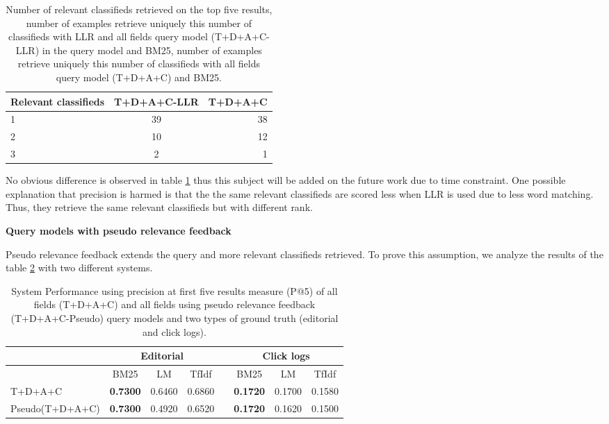 \begin{table}[H]
\begin{center}
\caption{Number of relevant classifieds retrieved on the top five results, number of examples retrieve uniquely this number of classifieds with LLR and all fields query model (T+D+A+C-LLR) in the query model and BM25, number of examples retrieve uniquely this number of classifieds with all fields query model (T+D+A+C) and BM25.}
\label{table:LLRP5}

\begin{tabular}{lcr}
\midrule
Relevant classifieds &  T+D+A+C-LLR & T+D+A+C \\
\midrule
	1 & 39 & 38 \\
	2 & 10 & 12  \\
	3 & 2 & 1 \\
\bottomrule
\end{tabular}
\end{center}
\end{table}



No obvious difference is observed in table \ref{table:LLRP5} thus this subject will be added on the future work due to time constraint. One possible explanation that precision is harmed is that the the same relevant classifieds are scored less when LLR is used due to less word matching. Thus, they retrieve the same relevant classifieds but with different rank.


 \textbf{Query models with pseudo relevance feedback}

 Pseudo relevance feedback extends the query and more relevant classifieds retrieved. To prove this assumption, we analyze the results of the table \ref{table:PseudoP5} with two different systems.

\begin{table}[H]
\begin{center}
\caption{System Performance using precision at first five results measure (P@5) of all fields (T+D+A+C) and all fields using pseudo relevance feedback (T+D+A+C-Pseudo) query models and two types of ground truth (editorial and click logs).}
\label{table:PseudoP5}
\begin{tabular}{lccccccc}
\toprule
 & \multicolumn{3}{c}{Editorial} & & \multicolumn{3}{c}{Click logs} \\
\midrule
& BM25 & LM & TfIdf &   & BM25 & LM & TfIdf \\
\midrule
	T+D+A+C & \textbf{0.7300} & 0.6460 & 0.6860 &   &		 \textbf{0.1720} & 0.1700 & 0.1580 \\
	Pseudo(T+D+A+C) & \textbf{0.7300} & 0.4920 & 0.6520 &   & \textbf{0.1720} & 0.1620 & 0.1500 \\
\bottomrule
\end{tabular}
\end{center}
\end{table}

